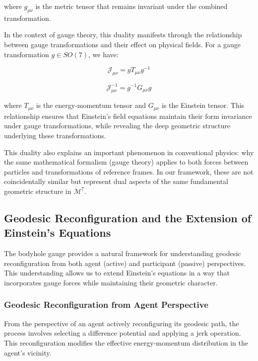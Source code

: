 \documentclass{article}
\begin{document}
where $g_{\mu\nu}$ is the metric tensor that remains invariant under the combined transformation.

In the context of gauge theory, this duality manifests through the relationship between gauge transformations and their effect on physical fields. For a gauge transformation $g \in SO(7)$, we have:

\begin{equation}
\mathcal{J}_{\mu\nu} = g T_{\mu\nu} g^{-1}
\end{equation}

\begin{equation}
\mathcal{J}^{-1}_{\mu\nu} = g^{-1} G_{\mu\nu} g
\end{equation}

where $T_{\mu\nu}$ is the energy-momentum tensor and $G_{\mu\nu}$ is the Einstein tensor. This relationship ensures that Einstein's field equations maintain their form invariance under gauge transformations, while revealing the deep geometric structure underlying these transformations.

This duality also explains an important phenomenon in conventional physics: why the same mathematical formalism (gauge theory) applies to both forces between particles and transformations of reference frames. In our framework, these are not coincidentally similar but represent dual aspects of the same fundamental geometric structure in $\mathcal{M}^7$.

\subsection{Geodesic Reconfiguration and the Extension of Einstein's Equations}

The bodyhole gauge provides a natural framework for understanding geodesic reconfiguration from both agent (active) and participant (passive) perspectives. This understanding allows us to extend Einstein's equations in a way that incorporates gauge forces while maintaining their geometric character.

\subsubsection{Geodesic Reconfiguration from Agent Perspective}

From the perspective of an agent actively reconfiguring its geodesic path, the process involves selecting a difference potential and applying a jerk operation. This reconfiguration modifies the effective energy-momentum distribution in the agent's vicinity.
\end{document}
